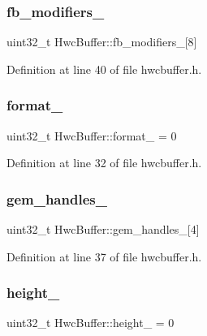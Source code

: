 \subsubsection{\texorpdfstring{fb\+\_\+modifiers\+\_\+}{fb\_modifiers\_}}
{\footnotesize\ttfamily uint32\+\_\+t Hwc\+Buffer\+::fb\+\_\+modifiers\+\_\+\mbox{[}8\mbox{]}}



Definition at line 40 of file hwcbuffer.\+h.

\mbox{\label{structHwcBuffer_ae37e601e5fe0b02095f6f8426657001c}} 
\subsubsection{\texorpdfstring{format\+\_\+}{format\_}}
{\footnotesize\ttfamily uint32\+\_\+t Hwc\+Buffer\+::format\+\_\+ = 0}



Definition at line 32 of file hwcbuffer.\+h.

\mbox{\label{structHwcBuffer_a0454a1651446654d1a863e844af23759}} 
\subsubsection{\texorpdfstring{gem\+\_\+handles\+\_\+}{gem\_handles\_}}
{\footnotesize\ttfamily uint32\+\_\+t Hwc\+Buffer\+::gem\+\_\+handles\+\_\+\mbox{[}4\mbox{]}}



Definition at line 37 of file hwcbuffer.\+h.

\mbox{\label{structHwcBuffer_a0cdc2e30a285f500ebf3da7390b68d6a}} 
\subsubsection{\texorpdfstring{height\+\_\+}{height\_}}
{\footnotesize\ttfamily uint32\+\_\+t Hwc\+Buffer\+::height\+\_\+ = 0}



